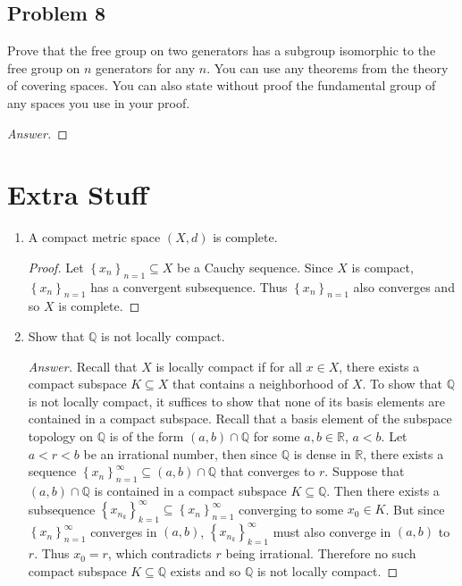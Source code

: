 \documentclass[12pt]{article}
\newcommand{\q}{\mathbb{Q}}
\newcommand{\real}{\mathbb{R}}
\newcommand\setb[1]{\left \{ #1 \right \}}
\theoremstyle{definition}
\begin{document}
\subsection{Problem 8}
Prove that the free group on two generators has a subgroup isomorphic to the free group on $n$ generators for any $n$. You can use any theorems from the theory of covering spaces. You can also state without proof the fundamental group of any spaces you use in your proof.
\begin{proof}[Answer]
    
\end{proof}
\newpage
\section{Extra Stuff}
\begin{enumerate}
    \item A compact metric space $(X,d)$ is complete. \cite{Berge}
    \begin{proof}
        Let $\setb{ x_n }_{n = 1} \subseteq X$ be a Cauchy sequence. Since $X$ is compact, $\setb{ x_n }_{n = 1}$ has a convergent subsequence. Thus $\setb{ x_n }_{n = 1}$ also converges and so $X$ is complete.
    \end{proof}
    \item Show that $\q$ is not locally compact.
    \begin{proof}[Answer]
        Recall that $X$ is locally compact if for all $x \in X$, there exists a compact subspace $K \subseteq X$ that contains a neighborhood of $X$. To show that $\q$ is not locally compact, it suffices to show that none of its basis elements are contained in a compact subspace. Recall that a basis element of the subspace topology on $\q$ is of the form $(a,b) \cap \q$ for some $a,b \in \real$, $a<b$. Let $a < r < b$ be an irrational number, then since $\q$ is dense in $\real$, there exists a sequence $\setb{ x_n }_{n = 1}^{\infty} \subseteq (a,b) \cap \q$ that converges to $r$. Suppose that $(a,b) \cap \q$ is contained in a compact subspace $K \subseteq \q$. Then there exists a subsequence $\setb{ x_{n_k} }_{k=1}^{\infty} \subseteq \setb{ x_n }_{n=1}^{\infty}$ converging to some $x_0 \in K$. But since $\setb{ x_n }_{n = 1}^{\infty}$ converges in $(a,b)$, $\setb{ x_{n_k} }_{k=1}^{\infty}$ must also converge in $(a,b)$ to $r$. Thus $x_0 = r$, which contradicts $r$ being irrational. Therefore no such compact subspace $K \subseteq \q$ exists and so $\q$ is not locally compact.
    \end{proof}
\end{enumerate}
\end{document}
